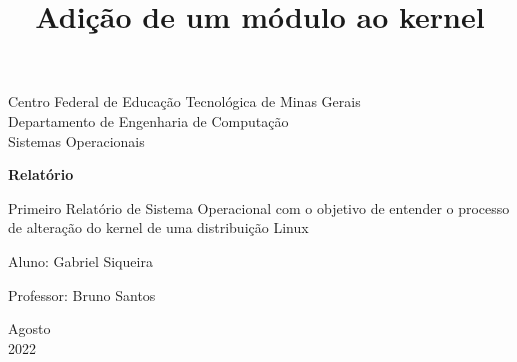 \documentclass[a4paper, 12pt]{article}
\begin{document}
\begin{titlepage}
	\begin{center}
	

		\large{Centro Federal de Educação Tecnológica de Minas Gerais}\\
		\large{Departamento de Engenharia de Computação}\\ 
		\large{Sistemas Operacionais}\\ 
\vspace{15pt}
        
        \vspace{85pt}
        
		\textbf{\LARGE{Relatório}}
		\title{\large{Adição de um módulo ao kernel}}
			
	\end{center}
\vspace{1,5cm}
	
	\begin{flushright}

   \begin{list}{}{
      \setlength{\leftmargin}{4.5cm}
      \setlength{\rightmargin}{0cm}
      \setlength{\labelwidth}{0pt}
      \setlength{\labelsep}{\leftmargin}}

      \item Primeiro Relatório de Sistema Operacional com o objetivo de entender o processo de alteração do kernel de uma distribuição Linux

      \begin{list}{}{
      \setlength{\leftmargin}{0cm}
      \setlength{\rightmargin}{0cm}
      \setlength{\labelwidth}{0pt}
      \setlength{\labelsep}{\leftmargin}}

			\item Aluno: Gabriel Siqueira \
            \item Professor: Bruno Santos \

      \end{list}
   \end{list}
\end{flushright}
\vspace{1cm}
\begin{center}
		\vspace{\fill}
		 Agosto\\
		 2022
			\end{center}
\end{titlepage}
\newpage
\newpage
\tableofcontents
\thispagestyle{empty}
\end{document}
